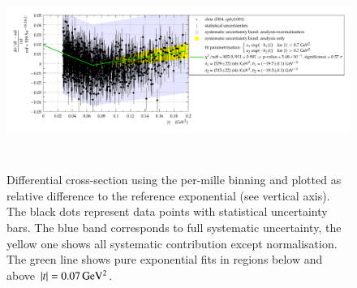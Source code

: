 \begin{figure}
\begin{center}
\includegraphics[height=6.5cm]{fig/t_dist_rel_with_split_fit.pdf}
\vskip-6mm
\caption{
Differential cross-section using the per-mille binning and plotted as relative difference to the reference exponential (see vertical axis). The black dots represent data points with statistical uncertainty bars. The blue band corresponds to full systematic uncertainty, the yellow one shows all systematic contribution except normalisation. The green line shows pure exponential fits in regions below and above $|t| = 0.07\,{\rm GeV^2}$.
}
\label{fig:data rel cpb0.001}
\end{center}
\end{figure}



